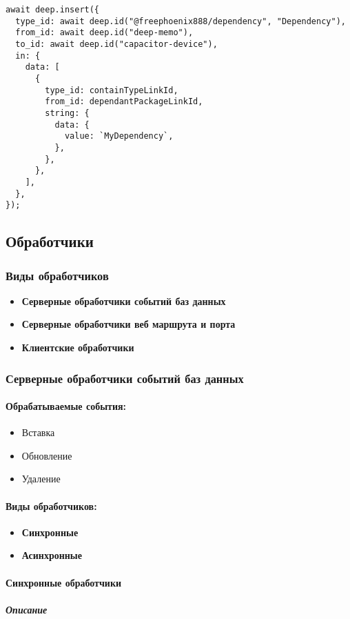\documentclass{article}
\begin{document}
\begin{lstlisting}
await deep.insert({
  type_id: await deep.id("@freephoenix888/dependency", "Dependency"),
  from_id: await deep.id("deep-memo"),
  to_id: await deep.id("capacitor-device"),
  in: {
    data: [
      {
        type_id: containTypeLinkId,
        from_id: dependantPackageLinkId,
        string: {
          data: {
            value: `MyDependency`,
          },
        },
      },
    ],
  },
});
\end{lstlisting}

\subsection{Обработчики}

\subsubsection{Виды обработчиков}
\begin{itemize}
  \item \textbf{Серверные обработчики событий баз данных}
  \item \textbf{Серверные обработчики веб маршрута и порта}
  \item \textbf{Клиентские обработчики}
\end{itemize}

\subsubsection{Серверные обработчики событий баз данных}
\paragraph{Обрабатываемые события:}
\begin{itemize}
  \item Вставка
  \item Обновление
  \item Удаление
\end{itemize}
\paragraph{Виды обработчиков:}
\begin{itemize}
  \item \textbf{Синхронные}
  \item \textbf{Асинхронные}
\end{itemize}

\paragraph{Синхронные обработчики}
\subparagraph{Описание}
\end{document}
